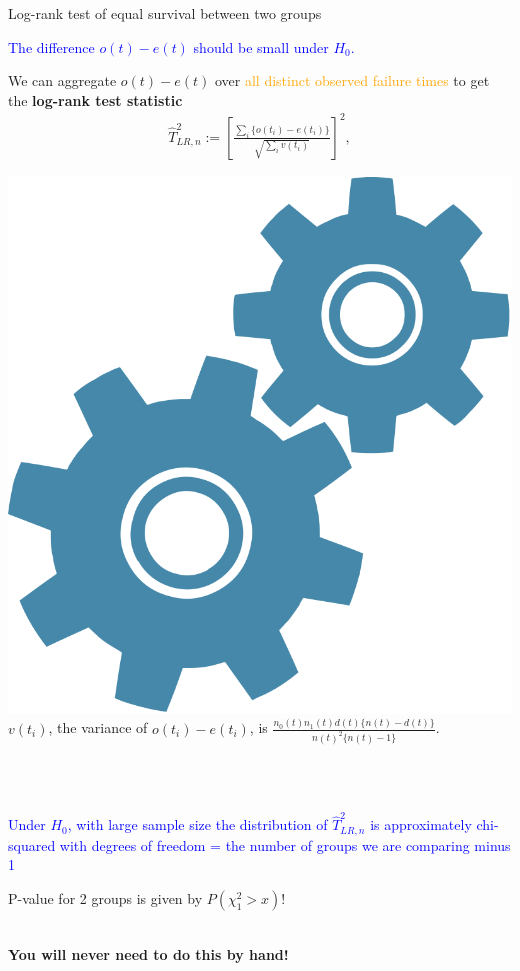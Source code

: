 \documentclass[10pt,t]{beamer}
\begin{document}
\begin{frame}{Log-rank test of equal survival between two groups }
\vspace{-7 mm}

\textcolor{blue}{The difference $o(t) - e(t)$ should be small under $H_0$.} 

\medskip

We can aggregate $o(t) - e(t)$ over \textcolor{orange}{all distinct observed failure times} to get the \textbf{log-rank test statistic}
\begin{align*}
\widehat{T}^2_{LR, n} := \left[\frac{\sum_i \{o(t_i) - e(t_i)\}}{\sqrt{\sum_iv(t_i)}} \right]^2,
\end{align*}

\medskip

\includegraphics[scale = 0.015]{figs/technical} $v(t_i)$, the variance of $o(t_i)-e(t_i)$, is $\frac{n_0(t)n_1(t)d(t)\{n(t)-d(t)\}}{n(t)^2\{n(t) - 1\}}$.

\\ ~\ 

\textcolor{blue}{Under $H_0$, with large sample size the distribution of $\widehat{T}^2_{LR, n}$ is approximately chi-squared with degrees of freedom = the number of groups we are comparing minus 1}

\medskip

P-value for 2 groups is given by $P(\chi^2_1 > x)$!
\\ ~\ 

\textbf{You will never need to do this by hand!}
\end{frame}
\end{document}
